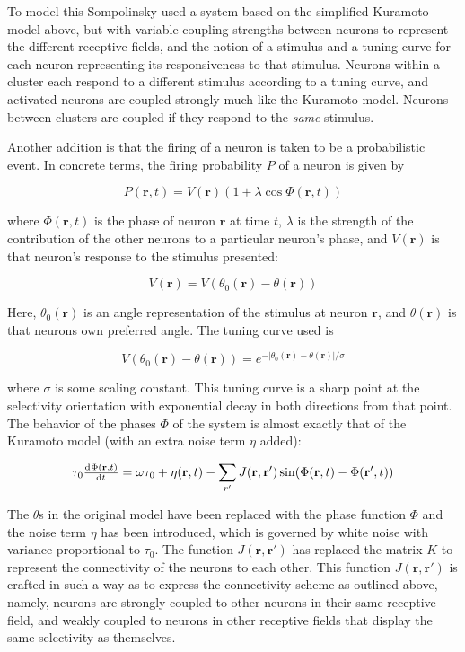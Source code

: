 \documentclass[12pt]{article}
\begin{document}
To model this Sompolinsky used a system based on the simplified Kuramoto model above, but with variable coupling strengths between neurons to represent the different receptive fields, and the notion of a stimulus and a tuning curve for each neuron representing its responsiveness to that stimulus.  Neurons within a cluster each respond to a different stimulus according to a tuning curve, and activated neurons are coupled strongly much like the Kuramoto model.  Neurons between clusters are coupled if they respond to the {\em same} stimulus.  

Another addition is that the firing of a neuron is taken to be a probabilistic event.  In concrete terms, the firing probability $P$ of a neuron is given by 

$$ P(\mathbf{r},t)=V(\mathbf{r})(1+\lambda\cos\Phi(\mathbf{r},t)) $$

where $\Phi(\mathbf{r},t)$ is the phase of neuron $\mathbf{r}$ at time $t$, $\lambda$ is the strength of the contribution of the other neurons to a particular neuron's phase, and $V(\mathbf{r})$ is that neuron's response to the stimulus presented:

$$ V(\mathbf{r})=V(\theta_0(\mathbf{r})-\theta(\mathbf{r})) $$

Here, $\theta_0(\mathbf{r})$ is an angle representation of the stimulus at neuron $\mathbf{r}$, and $\theta(\mathbf{r})$ is that neurons own preferred angle.  The tuning curve used is 

$$ V(\theta_0(\mathbf{r})-\theta(\mathbf{r}))=e^{-|\theta_0(\mathbf{r})-\theta(\mathbf{r})|/\sigma} $$

where $\sigma$ is some scaling constant.  This tuning curve is a sharp point at the selectivity orientation with exponential decay in both directions from that point.  The behavior of the phases $\Phi$ of the system is almost exactly that of the Kuramoto model (with an extra noise term $\eta$ added):

$$ \tau_0\od{\Phi(\mathbf{r},t)}{t}=\omega\tau_0+\eta(\mathbf{r},t)-\sum\limits_{r'}J(\mathbf{r},\mathbf{r}')\sin(\Phi(\mathbf{r},t)-\Phi(\mathbf{r'},t)) $$

The $\theta$s in the original model have been replaced with the phase function $\Phi$ and the noise term $\eta$ has been introduced, which is governed by white noise with variance proportional to $\tau_0$.  The function $J(\mathbf{r},\mathbf{r'})$ has replaced the matrix $K$ to represent the connectivity of the neurons to each other.  This function $J(\mathbf{r},\mathbf{r'})$ is crafted in such a way as to express the connectivity scheme as outlined above, namely, neurons are strongly coupled to other neurons in their same receptive field, and weakly coupled to neurons in other receptive fields that display the same selectivity as themselves.  
\end{document}
